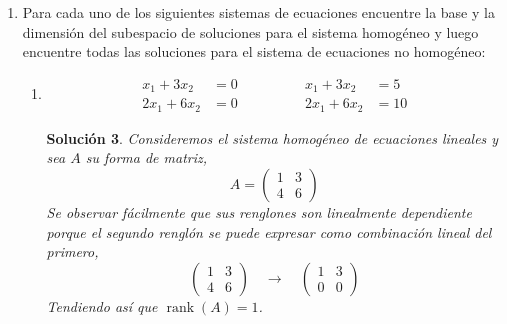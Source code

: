 \documentclass[letterpaper]{article}
\DeclareMathOperator{\rank}{rank}
\newtheorem*{sol}{Solución}
\begin{document}
\begin{enumerate}
\begin{enumerate}[label=(\alph*)]
\begin{sol}
    Por tanto
    \[
        T^{-1}(a_0 + a_1x + a_2 x^2) = (a_0 - a_1) + (a_1 - 2a_2)x + a_2 x^2
    \]
    \end{sol}

    \item Verifique que la transformación obtenida en el paso anterior es efectivamente la transformación inversa.
    \begin{sol}
        Es invertible porque
        \[
            [T]_\beta ([T]_\beta)^{-1} = ([T]_\beta)^{-1} [T]_\beta= I_3
        \]
    \end{sol}
\end{enumerate}

\item Para cada uno de los siguientes sistemas de ecuaciones encuentre la base y la dimensión del subespacio
de soluciones para el sistema homogéneo y luego encuentre todas las soluciones para el sistema de
ecuaciones no homogéneo:
\begin{enumerate}[label=(\alph*)]
    \item
    \begin{equation*}
        \begin{split}
            x_1 + 3x_2 &= 0\\
            2x_1 + 6x_2 &= 0
        \end{split} 
        \qquad\qquad
        \begin{split}
            x_1 + 3x_2 &= 5\\
            2x_1 + 6x_2 &= 10
        \end{split}
    \end{equation*}
    
    \begin{sol}
    Consideremos el sistema homogéneo de ecuaciones lineales y sea $A$ su forma de matriz,
    \[
        A =
        \begin{pmatrix}
            1 & 3\\ 
            4 & 6
        \end{pmatrix}
    \]
    Se observar fácilmente que sus renglones son linealmente dependiente porque el segundo renglón
    se puede expresar como combinación lineal del primero,
    \[
        \begin{pmatrix}
            1 & 3\\ 
            4 & 6
        \end{pmatrix}
        \quad\longrightarrow\quad
        \begin{pmatrix}
            1 & 3\\ 
            0 & 0
        \end{pmatrix}
    \]
    Tendiendo así que $\rank(A) = 1$.


\end{sol}
\end{enumerate}
\end{enumerate}
\end{document}
